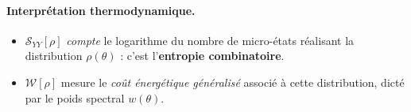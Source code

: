 


\paragraph{Interprétation thermodynamique.}

\begin{itemize}[label = $\bullet$] 
\item $\mathcal{S}_{YY}[\rho]$ \emph{compte} le logarithme du nombre de
      micro-états réalisant la distribution $\rho(\theta)$ :
      c’est l’\textbf{entropie combinatoire}.
\item $\mathcal{W}[\rho]$ mesure le \emph{coût énergétique généralisé}
      associé à cette distribution, dicté par le poids spectral $w(\theta)$.
\end{itemize}

